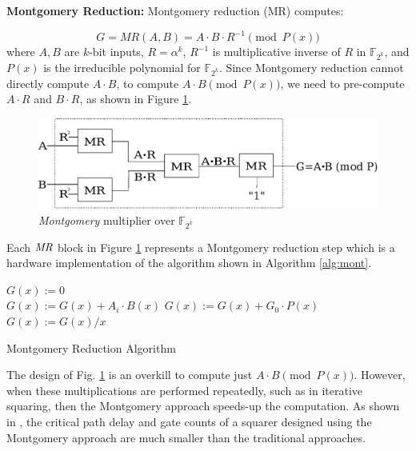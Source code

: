 {\bf Montgomery Reduction:}  Montgomery reduction (MR) computes: 

\begin{equation}
G=MR(A,B)=A\cdot B \cdot R^{-1} \pmod {P(x)}
\end{equation}
where $A,B$ are $k$-bit inputs, $R={\alpha}^k$, $R^{-1}$ is multiplicative
inverse of $R$ in $\mathbb{F}_{2^k}$, and $P(x)$ is the irreducible polynomial for
$\mathbb{F}_{2^k}$. Since Montgomery reduction cannot directly compute $A\cdot B$, 
to compute $A\cdot B \pmod {P(x)}$, we need to pre-compute $A\cdot R$ and $B\cdot R$,
as shown in Figure \ref{fig:mm4}.  

\begin{figure}[t]
	\begin{center}
	\includegraphics[scale=0.50]{figures/mmcircuit.eps}
	\end{center}
	\caption{{\it Montgomery} multiplier over $\mathbb{F}_{2^k}$}
	\label{fig:mm4}
\end{figure}

Each $\it MR$ block in Figure \ref{fig:mm4} represents a Montgomery reduction step which 
is a hardware implementation of the algorithm shown in Algorithm \ref{alg:mont}. 

\begin{algorithm}
\SetAlgoNoLine

  $G(x):=$0 \\
  {
	$G(x):=G(x)+A_i\cdot B(x)$ 
	$G(x):=G(x)+G_0\cdot P(x)$ 
	$G(x):=G(x) / x$ 
  }
\caption{Montgomery Reduction Algorithm \cite{acar:1998}}\label{alg:mont}
\end{algorithm}

The design of Fig. \ref{fig:mm4} is an overkill to compute just
$A\cdot B \pmod{ P(x)}$. However, when these multiplications are
performed repeatedly, such as in iterative squaring, then the
Montgomery approach speeds-up the computation. 
As shown in \cite{wu:2002}, the critical path delay and gate counts of a squarer designed using the Montgomery
approach are much smaller than the traditional approaches. 


